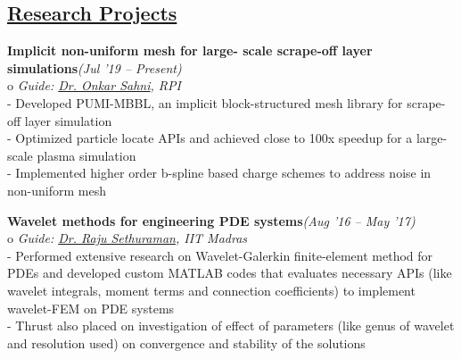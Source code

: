 \documentclass[margin,line]{res}
\begin{document}
\begin{resume}
\section {\sc \href{https://vickyragav95.github.io/research.html}{\color{RoyalPurple}Research Projects}}
\textbullet\hspace{0.005cm} {\bf Implicit non-uniform mesh for large-
	scale scrape-off layer simulations}\hfill {\em (Jul '19 -- Present)}\\
o {\em Guide: \href {https://homepages.rpi.edu/~sahni/} {\color{RoyalPurple} Dr. Onkar Sahni}, RPI}\\
- Developed PUMI-MBBL, an implicit block-structured
mesh library for scrape-off layer simulation\\
- Optimized particle locate APIs and achieved close to
100x speedup for a large-scale plasma simulation\\
- Implemented higher order b-spline based charge
schemes to address noise in non-uniform mesh

\textbullet\hspace{0.005cm} {\bf Wavelet methods for engineering PDE systems}\hfill {\em (Aug '16 -- May '17)}\\
o {\em Guide: \href {https://mech.iitm.ac.in/meiitm/personnal/raju-sethuraman/} {\color{RoyalPurple} Dr. Raju Sethuraman}, IIT Madras}\\
- Performed extensive research on Wavelet-Galerkin finite-element method for PDEs and developed custom MATLAB codes that evaluates necessary APIs (like wavelet integrals, moment terms and connection coefficients) to implement wavelet-FEM on PDE systems\\
- Thrust also placed on investigation of effect of parameters (like genus of wavelet and resolution used) on convergence and stability of the solutions


\end{resume}
\end{document}
